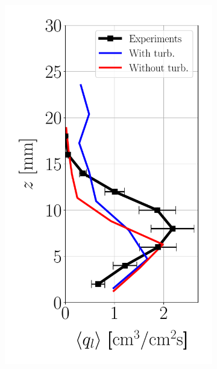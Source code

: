 \begin{figure}[h!]
\flushleft
\begin{subfigure}[b]{0.2\textwidth}
	\flushleft
   \includegraphics[scale=0.35]{./part2_developments/figures_ch6_lagrangian_JICF/params_turb_injection/profiles/flux_along_z}
\end{subfigure}
\hspace*{0.5in}
\begin{subfigure}[b]{0.2\textwidth}
	\flushleft

\end{subfigure}
\end{figure}

